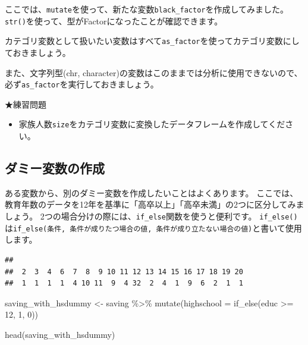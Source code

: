 \documentclass[
]{book}
\newenvironment{Shaded}{\begin{snugshade}}{\end{snugshade}}
\newcommand{\AttributeTok}[1]{\textcolor[rgb]{0.77,0.63,0.00}{#1}}
\newcommand{\CommentTok}[1]{\textcolor[rgb]{0.56,0.35,0.01}{\textit{#1}}}
\newcommand{\DecValTok}[1]{\textcolor[rgb]{0.00,0.00,0.81}{#1}}
\newcommand{\FunctionTok}[1]{\textcolor[rgb]{0.00,0.00,0.00}{#1}}
\newcommand{\NormalTok}[1]{#1}
\newcommand{\OtherTok}[1]{\textcolor[rgb]{0.56,0.35,0.01}{#1}}
\newcommand{\SpecialCharTok}[1]{\textcolor[rgb]{0.00,0.00,0.00}{#1}}
\providecommand{\tightlist}{%
  \setlength{\itemsep}{0pt}\setlength{\parskip}{0pt}}
\begin{document}
ここでは、\texttt{mutate}を使って、新たな変数\texttt{black\_factor}を作成してみました。
\texttt{str()}を使って、型がFactorになったことが確認できます。

カテゴリ変数として扱いたい変数はすべて\texttt{as\_factor}を使ってカテゴリ変数にしておきましょう。

また、文字列型(chr, character)の変数はこのままでは分析に使用できないので、必ず\texttt{as\_factor}を実行しておきましょう。

★練習問題

\begin{itemize}
\tightlist
\item
  家族人数\texttt{size}をカテゴリ変数に変換したデータフレームを作成してください。
\end{itemize}

\hypertarget{ux30c0ux30dfux30fcux5909ux6570ux306eux4f5cux6210}{%
\subsection{ダミー変数の作成}\label{ux30c0ux30dfux30fcux5909ux6570ux306eux4f5cux6210}}

ある変数から、別のダミー変数を作成したいことはよくあります。
ここでは、教育年数のデータを12年を基準に「高卒以上」「高卒未満」の2つに区分してみましょう。
2つの場合分けの際には、\texttt{if\_else}関数を使うと便利です。
\texttt{if\_else()}は\texttt{if\_else(条件,\ 条件が成りたつ場合の値,\ 条件が成り立たない場合の値)}と書いて使用します。

\begin{Shaded}
\end{Shaded}

\begin{verbatim}
## 
##  2  3  4  6  7  8  9 10 11 12 13 14 15 16 17 18 19 20 
##  1  1  1  1  4 10 11  9  4 32  2  4  1  9  6  2  1  1
\end{verbatim}

\begin{Shaded}
\begin{Highlighting}[]
\NormalTok{saving\_with\_hsdummy }\OtherTok{\textless{}{-}}
\NormalTok{  saving }\SpecialCharTok{\%\textgreater{}\%}
    \FunctionTok{mutate}\NormalTok{(}\AttributeTok{highschool =} \FunctionTok{if\_else}\NormalTok{(educ }\SpecialCharTok{\textgreater{}=} \DecValTok{12}\NormalTok{, }\DecValTok{1}\NormalTok{, }\DecValTok{0}\NormalTok{))}

\FunctionTok{head}\NormalTok{(saving\_with\_hsdummy)}
\end{Highlighting}
\end{Shaded}
\end{document}
